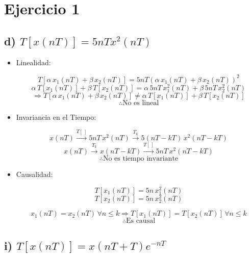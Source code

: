 \section*{Ejercicio 1}

\subsection*{d) $T[x(nT)] = 5nT x^2(nT)$}

\begin{itemize}
    \item Linealidad:
    
    \[T[\alpha\, x_1(nT) + \beta\, x_2(nT)] = 5nT(\alpha\, x_1(nT) + \beta\, x_2(nT))^2\]
\[\alpha\, T[x_1(nT)] + \beta\, T[x_2(nT)] = \alpha \,5nT\,x_1^2(nT) + \beta\, 5nT\,x_2^2(nT)\]
\[\Rightarrow T[\alpha\, x_1(nT) + \beta\, x_2(nT)] \neq \alpha\, T[x_1(nT)] + \beta\, T[x_2(nT)]\]
 $$\therefore \text{No es lineal}$$
    
    \item Invariancia en el Tiempo:
    
    \[x(nT) \xrightarrow{T[\,]} 5nT\,x^2(nT) \xrightarrow{T_k} 5(nT-kT)\,x^2(nT-kT)\]
\[x(nT) \xrightarrow{T_k} x(nT-kT) \xrightarrow{T[\,]} 5nT\, x^2(nT-kT)\]
$$\therefore \text{No es tiempo invariante}$$

    \item Causalidad:
    
    \[T[x_1(nT)] = 5n\,x^2_1(nT)\]
\[T[x_2(nT)] = 5n\,x^2_2(nT)\]

\[x_1(nT)=x_2(nT) \,\forall n\leq k \Rightarrow T[x_1(nT)]=T[x_2(nT)] \,\forall n\leq k\]
 $$\therefore \text{Es causal}$$

\end{itemize}

\subsection*{i) $T[x(nT)] = x(nT + T) e^{-nT}$}

